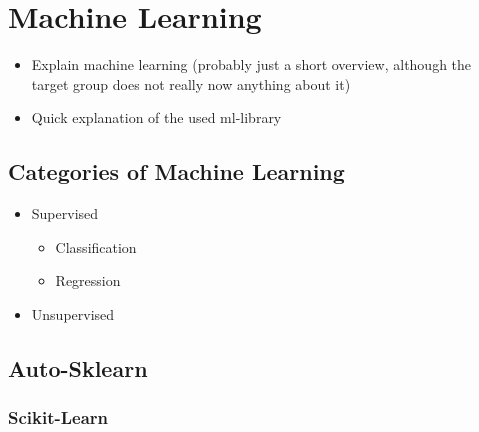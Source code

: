 \section{Machine Learning}
\begin{itemize}
  \item Explain machine learning (probably just a short overview, although the target group does not really now anything about it)
  \item Quick explanation of the used ml-library
\end{itemize}

\subsection{Categories of Machine Learning}
\begin{itemize}
  \item Supervised
        \begin{itemize}
          \item Classification
          \item Regression
        \end{itemize}
  \item Unsupervised
\end{itemize}

\subsection{Auto-Sklearn}
\subsubsection{Scikit-Learn} %